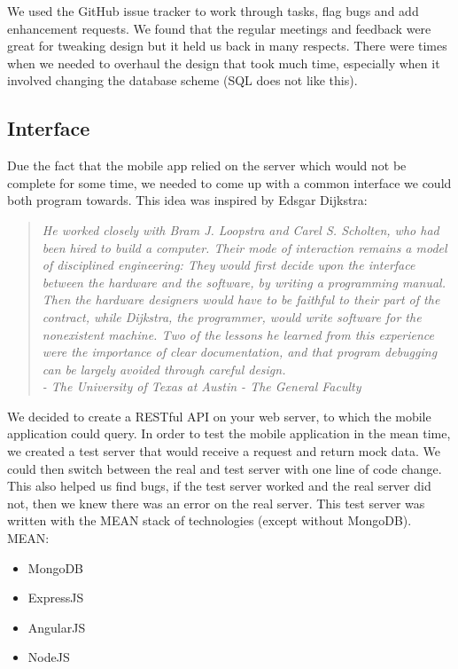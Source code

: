 We used the GitHub issue tracker to work through tasks, flag bugs and add enhancement requests.
We found that the regular meetings and feedback were great for tweaking design but it held us back in many respects.
There were times when we needed to overhaul the design that took much time, especially when it involved changing the database scheme (SQL does not like this).

\subsection{Interface}
Due the fact that the mobile app relied on the server which would not be complete for some time, we needed to come up with a common interface we could both program towards.
This idea was inspired by Edsgar Dijkstra:
\begin{quote}
	\itshape He worked closely with Bram J. Loopstra and Carel S. Scholten, who had been hired to build a computer. Their mode of interaction remains a model of disciplined engineering: They would first decide upon the interface between the hardware and the software, by writing a programming manual. Then the hardware designers would have to be faithful to their part of the contract, while Dijkstra, the programmer, would write software for the nonexistent machine. Two of the lessons he learned from this experience were the importance of clear documentation, and that program debugging can be largely avoided through careful design.
	\hfill 
	\\
	- The University of Texas at Austin - The General Faculty \cite{dijkstra_interface}
\end{quote}

We decided to create a RESTful API on your web server, to which the mobile application could query.
In order to test the mobile application in the mean time, we created a test server that would receive a request and return mock data.
We could then switch between the real and test server with one line of code change.
This also helped us find bugs, if the test server worked and the real server did not, then we knew there was an error on the real server.
This test server was written with the MEAN stack of technologies (except without MongoDB).
\\

MEAN:
\begin{itemize}
\item MongoDB
\item ExpressJS
\item AngularJS
\item NodeJS
\end{itemize}

